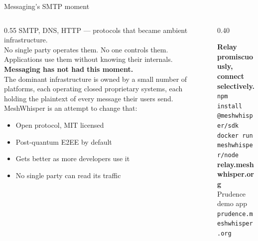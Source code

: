 \documentclass[aspectratio=169, 11pt]{beamer}
\begin{document}
\begin{frame}{Messaging's SMTP moment}
\vspace{4mm}
\begin{columns}[T]
  \begin{column}{0.55\textwidth}
    \small
    SMTP, DNS, HTTP — protocols that became ambient infrastructure.\\
    No single party operates them. No one controls them.\\
    Applications use them without knowing their internals.\\[8pt]

    \textbf{Messaging has not had this moment.}\\[4pt]
    The dominant infrastructure is owned by a small number of platforms,
    each operating closed proprietary systems, each holding the plaintext
    of every message their users send.\\[8pt]

    MeshWhisper is an attempt to change that:\\[4pt]
    \begin{itemize}\small
      \item Open protocol, MIT licensed
      \item Post-quantum E2EE by default
      \item Gets better as more developers use it
      \item No single party can read its traffic
    \end{itemize}
  \end{column}
  \begin{column}{0.40\textwidth}
    \vspace{6mm}
    \begin{mdframed}[backgroundcolor=mwlight, linecolor=mwaccent, linewidth=0.8pt,
      innerleftmargin=8pt, innerrightmargin=8pt, innertopmargin=8pt, innerbottommargin=8pt,
      roundcorner=4pt]
    \centering
    \small\color{mwblue}
    \textbf{Relay promiscuously,}\\
    \textbf{connect selectively.}\\[8pt]
    \color{mwgray}
    \texttt{npm install @meshwhisper/sdk}\\[4pt]
    \texttt{docker run meshwhisper/node}\\[8pt]
    \textbf{relay.meshwhisper.org}\\[2pt]
    \textcolor{mwaccent}{Prudence demo app}\\
    \texttt{prudence.meshwhisper.org}
    \end{mdframed}
  \end{column}
\end{columns}
\end{frame}
\end{document}
